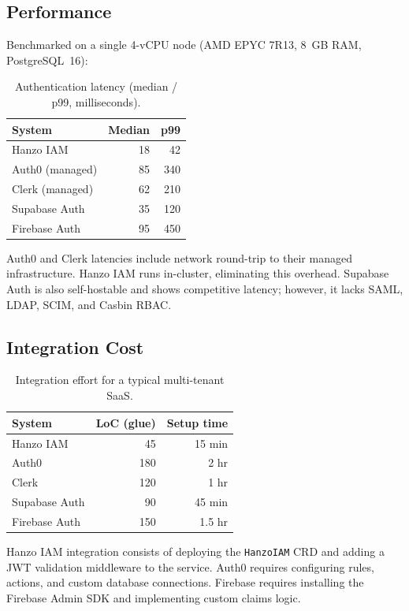 \subsection{Performance}

Benchmarked on a single 4-vCPU node (AMD EPYC 7R13, 8~GB RAM, PostgreSQL~16):

\begin{table}[H]
\centering
\caption{Authentication latency (median / p99, milliseconds).}
\footnotesize
\begin{tabular}{@{}lrr@{}}
\toprule
System & Median & p99 \\
\midrule
Hanzo IAM & 18 & 42 \\
Auth0 (managed) & 85 & 340 \\
Clerk (managed) & 62 & 210 \\
Supabase Auth & 35 & 120 \\
Firebase Auth & 95 & 450 \\
\bottomrule
\end{tabular}
\end{table}

Auth0 and Clerk latencies include network round-trip to their managed infrastructure. Hanzo IAM runs in-cluster, eliminating this overhead. Supabase Auth is also self-hostable and shows competitive latency; however, it lacks SAML, LDAP, SCIM, and Casbin RBAC.

\subsection{Integration Cost}

\begin{table}[H]
\centering
\caption{Integration effort for a typical multi-tenant SaaS.}
\footnotesize
\begin{tabular}{@{}lrr@{}}
\toprule
System & LoC (glue) & Setup time \\
\midrule
Hanzo IAM & 45 & 15 min \\
Auth0 & 180 & 2 hr \\
Clerk & 120 & 1 hr \\
Supabase Auth & 90 & 45 min \\
Firebase Auth & 150 & 1.5 hr \\
\bottomrule
\end{tabular}
\end{table}

Hanzo IAM integration consists of deploying the \texttt{HanzoIAM} CRD and adding a JWT validation middleware to the service. Auth0 requires configuring rules, actions, and custom database connections. Firebase requires installing the Firebase Admin SDK and implementing custom claims logic.

